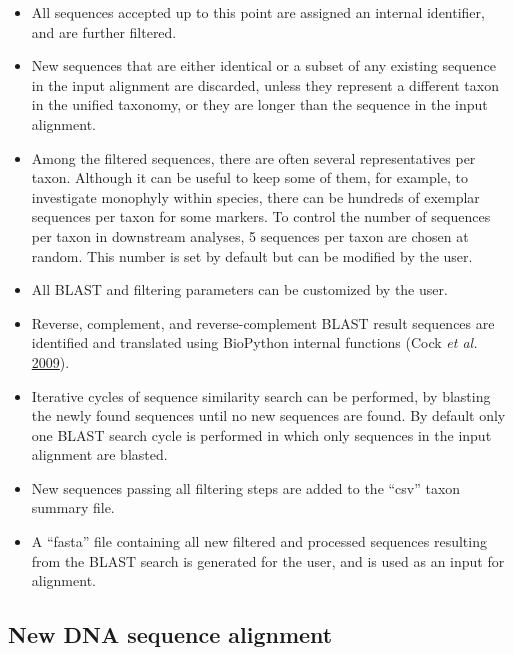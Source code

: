 \documentclass[]{article}
\begin{document}
\begin{itemize}
\item
  All sequences accepted up to this point are assigned an internal identifier, and are further filtered.
\item
  New sequences that are either identical or a subset of any existing sequence in the input alignment are discarded, unless they represent a different taxon in the unified taxonomy, or they are longer than the sequence in the input alignment.
\item
  Among the filtered sequences, there are often several representatives per taxon.
  Although it can be useful to keep some of them, for example, to investigate monophyly
  within species, there can be hundreds of exemplar sequences per taxon for some markers.
  To control the number of sequences per taxon in downstream analyses,
  5 sequences per taxon are chosen at random. This number is set by default but can be modified by the user.
\item
  All BLAST and filtering parameters can be customized by the user.
\item
  Reverse, complement, and reverse-complement BLAST result sequences are identified and translated using BioPython internal functions (Cock \emph{et al.} \protect\hyperlink{ref-cock2009biopython}{2009}).
\item
  Iterative cycles of sequence similarity search can be performed, by blasting the newly found sequences until no new sequences are found. By default only one BLAST search cycle is performed in which only sequences in the input alignment are blasted.
\item
  New sequences passing all filtering steps are added to the ``csv'' taxon summary file.
\item
  A ``fasta'' file containing all new filtered and processed sequences resulting from the BLAST search is generated for the user, and is used as an input for alignment.
\end{itemize}

\hypertarget{new-dna-sequence-alignment}{%
\subsection{New DNA sequence alignment}\label{new-dna-sequence-alignment}}
\end{document}
